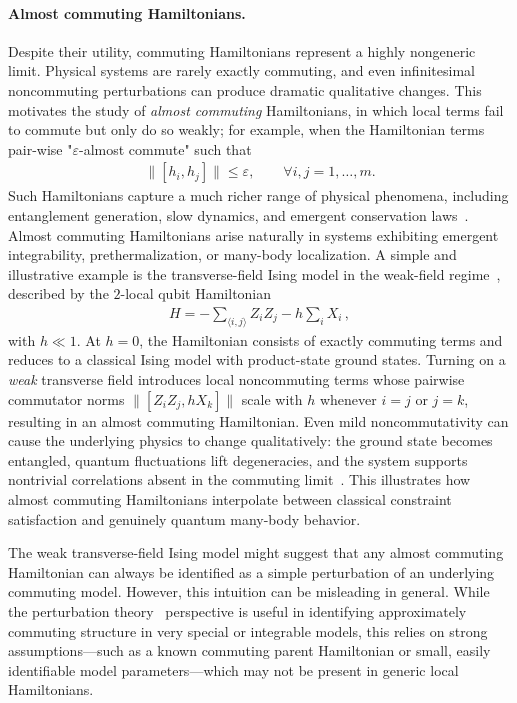 \documentclass[11pt]{article}
\theoremstyle{plain}
\newcommand{\eps}{\varepsilon}
\begin{document}
\paragraph{Almost commuting Hamiltonians.}
Despite their utility, commuting Hamiltonians represent a highly nongeneric limit.  Physical systems are rarely exactly commuting, and even infinitesimal noncommuting perturbations can produce dramatic qualitative changes. 
 This motivates the study of \emph{almost commuting} Hamiltonians, in 
 which local terms fail to commute but only do so weakly; for example, when the Hamiltonian terms pair-wise "$\eps$-almost commute" such that
\begin{align}
\|[h_i,h_j]\| \leq \eps, \quad\quad \forall i,j=1,\dots,m.   
\end{align}
Such Hamiltonians capture a much richer range of physical phenomena, including 
entanglement generation, slow dynamics, and emergent conservation laws~\cite{Sachdev2011}. Almost 
 commuting Hamiltonians arise naturally in systems exhibiting emergent integrability, prethermalization, or many-body localization. 
A simple and illustrative example is the transverse-field Ising model 
in the weak-field regime~\cite{Sachdev2011}, described by the $2$-local qubit Hamiltonian
\begin{align}\label{eq:ising}
H = -\sum_{\langle i,j \rangle} Z_i Z_j - h \sum_i X_i \, ,
\end{align}
with $h \ll 1$.  At $h=0$, the Hamiltonian consists of exactly 
commuting terms and reduces to a classical Ising model with 
product-state ground states.  Turning on a \emph{weak} transverse field 
introduces local noncommuting terms whose pairwise commutator norms 
$\|[Z_i Z_j,hX_k]\|$
scale with $h$ whenever $i=j$ or $j=k$, resulting in an almost commuting Hamiltonian. Even
mild noncommutativity can cause the underlying physics to 
change qualitatively: the ground state becomes entangled, quantum fluctuations lift degeneracies, and the system supports nontrivial correlations absent in the commuting limit~\cite{Mbeng_2024}.  This illustrates how almost commuting Hamiltonians interpolate between classical constraint satisfaction and genuinely quantum many-body behavior.

The weak transverse-field Ising model might suggest that any almost commuting Hamiltonian can always be identified as a simple perturbation of an underlying commuting model. However, this intuition can be misleading in general. While the perturbation theory~\cite{Kato:1966:PTL} perspective is useful in identifying approximately commuting structure in very special or integrable models, this relies on strong assumptions---such as a known commuting parent Hamiltonian or small, easily identifiable model parameters---which may not be present in generic local Hamiltonians. 
\end{document}
